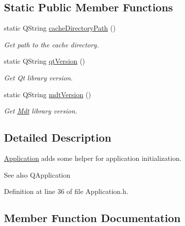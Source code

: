 \subsection*{Static Public Member Functions}
\begin{DoxyCompactItemize}
\item 
static Q\+String \hyperlink{class_mdt_1_1_application_ac78756faf1b2c36c4f4f11334c3f8516}{cache\+Directory\+Path} ()
\begin{DoxyCompactList}\small\item\em Get path to the cache directory. \end{DoxyCompactList}\item 
static Q\+String \hyperlink{class_mdt_1_1_application_ac2842431a2fa3fb63345d99e8943baa0}{qt\+Version} ()\hypertarget{class_mdt_1_1_application_ac2842431a2fa3fb63345d99e8943baa0}{}\label{class_mdt_1_1_application_ac2842431a2fa3fb63345d99e8943baa0}

\begin{DoxyCompactList}\small\item\em Get Qt library version. \end{DoxyCompactList}\item 
static Q\+String \hyperlink{class_mdt_1_1_application_a818de2899b8aad3623e4fe46245f82e6}{mdt\+Version} ()\hypertarget{class_mdt_1_1_application_a818de2899b8aad3623e4fe46245f82e6}{}\label{class_mdt_1_1_application_a818de2899b8aad3623e4fe46245f82e6}

\begin{DoxyCompactList}\small\item\em Get \hyperlink{namespace_mdt}{Mdt} library version. \end{DoxyCompactList}\end{DoxyCompactItemize}


\subsection{Detailed Description}
\hyperlink{class_mdt_1_1_application}{Application} adds some helper for application initialization. 

\begin{DoxySeeAlso}{See also}
Q\+Application 
\end{DoxySeeAlso}


Definition at line 36 of file Application.\+h.



\subsection{Member Function Documentation}
